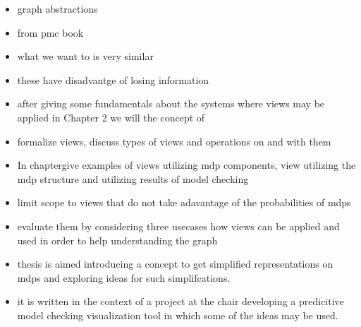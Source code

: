 \documentclass[preview]{standalone}
\begin{document}
\begin{itemize}
	\item graph abstractions
	\item from pmc book
	\item what we want to is very similar
	\item these have disadvantge of losing information
	\item after giving some fundamentals about the systems where views may be applied in Chapter 2 we will the concept of
	\item formalize views, discuss types of views and operations on and with them 
	\item  In chaptergive examples of views utilizing mdp components, view utilizing the mdp structure and utilizing results of model checking
	\item limit scope to views that do not take adavantage of the probabilities of mdps
	\item evaluate them by considering three usecases how views can be applied and used in order to help understanding the graph
	\item thesis is aimed introducing a concept to get simplified representations on mdps and exploring ideas for such simplifcations.
	\item it is written in the context of a project at the chair developing a predicitive model checking visualization tool in which some of the ideas may be used.
	
\end{itemize}
\end{document}
